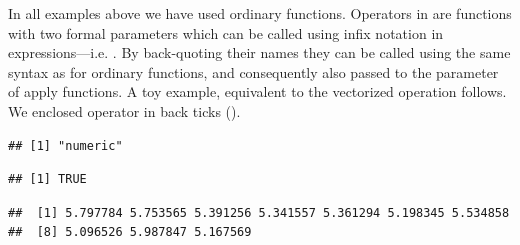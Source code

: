 \documentclass[krantz2]{krantz}\usepackage{knitr}%
\begin{document}
In all examples above we have used ordinary functions. Operators in \Rlang are functions with two formal parameters which can be called using infix notation in expressions---i.e. . By back-quoting their names they can be called using the same syntax as for ordinary functions, and consequently also passed to the  parameter of apply functions. A toy example, equivalent to the vectorized operation  follows. We enclosed operator \code{+} in back ticks ().

\begin{knitrout}\footnotesize
{}\color{fgcolor}\begin{kframe}
\begin{alltt}
\hlstd{(}\hlstd{)} 
 \hlkwb{<-} \hlstd{(}\hlstd{)}
 \hlkwb{<-} \hlstd{(}     \hlstd{=} \hlstd{)}
\end{alltt}
\begin{verbatim}
## [1] "numeric"
\end{verbatim}
\begin{alltt}
\end{alltt}
\begin{verbatim}
## [1] TRUE
\end{verbatim}
\begin{alltt}
\end{alltt}
\begin{verbatim}
##  [1] 5.797784 5.753565 5.391256 5.341557 5.361294 5.198345 5.534858
##  [8] 5.096526 5.987847 5.167569
\end{verbatim}
\end{kframe}
\end{knitrout}
\end{document}
